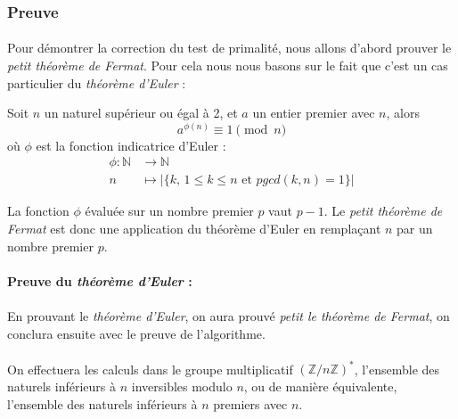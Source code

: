 	
	\subsubsection{Preuve}
		\paragraph{}Pour démontrer la correction du test de primalité, nous allons d'abord prouver le \textit{petit théorème de Fermat}. Pour cela nous nous basons sur le fait que c'est un cas particulier du \textit{théorème d'Euler} :
		
		\vspace{-1.5em}\begin{adjustwidth}{1.5cm}{1.5cm} 
		\begin{Th}
			\label{ThEuler}
			Soit $n$ un naturel supérieur ou égal à 2, et $a$ un entier premier avec $n$, alors
			\[a^{\phi(n)}\equiv 1 \pmod n\]
			où $\phi$ est la fonction indicatrice d'Euler :
			\begin{align*}
				\phi \colon \mathbb{N} &\to \mathbb{N}\\
				n &\mapsto | \{k \text{, } 1 \leq k \leq n \text{ et } pgcd(k,n) = 1\} |
			\end{align*}
		\end{Th}
		\end{adjustwidth}\vspace{0.5em}
		
		La fonction $\phi$ évaluée sur un nombre premier $p$ vaut $p - 1$. Le \textit{petit théorème de Fermat} est donc une application du théorème d'Euler en remplaçant $n$ par un nombre premier $p$.
		
		\paragraph{Preuve du \textit{théorème d'Euler} :} 
		\paragraph{}En prouvant le \textit{théorème d'Euler}, on aura prouvé \textit{petit le théorème de Fermat}, on conclura ensuite avec le preuve de l'algorithme.
			
		\paragraph{}On effectuera les calculs dans le groupe multiplicatif $(\mathbb{Z}/n\mathbb{Z})^*$, l'ensemble des naturels inférieurs à $n$ inversibles modulo $n$, ou de manière équivalente, l'ensemble des naturels inférieurs à $n$ premiers avec $n$.
		
